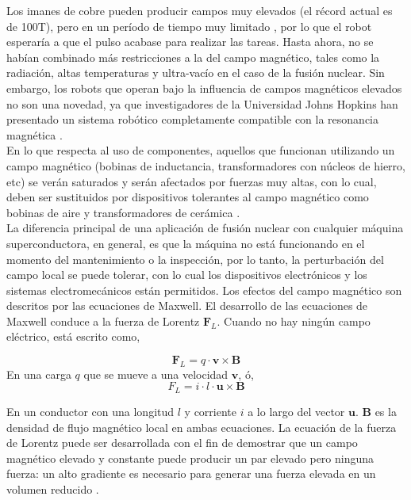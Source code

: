 Los imanes de cobre pueden producir campos muy elevados (el récord actual es de 100T), pero en un período de tiempo muy limitado \cite{Kiyoshi2006}, por lo que el robot esperaría a que el pulso acabase para realizar las tareas. Hasta ahora, no se habían combinado más restricciones a la del campo magnético, tales como la radiación, altas temperaturas y ultra-vacío en el caso de la fusión nuclear. Sin embargo, los robots que operan bajo la influencia de campos magnéticos elevados no son una novedad, ya que investigadores de la Universidad Johns Hopkins han presentado un sistema robótico completamente compatible con la resonancia magnética \cite{Muntener2006}.\\


En lo que respecta al uso de componentes, aquellos que funcionan utilizando un campo magnético (bobinas de inductancia, transformadores con núcleos de hierro, etc) se verán saturados y serán afectados por fuerzas muy altas, con lo cual, deben ser sustituidos por dispositivos tolerantes al campo magnético como bobinas de aire y transformadores de cerámica \cite{izard2010hardening} .\\


La diferencia principal de una aplicación de fusión nuclear con cualquier máquina superconductora, en general, es que la máquina no está funcionando en el momento del mantenimiento o la inspección, por lo tanto, la perturbación del campo local se puede tolerar, con lo cual los dispositivos electrónicos y los sistemas electromecánicos están permitidos. Los efectos del campo magnético son descritos por las ecuaciones de Maxwell. El desarrollo de las ecuaciones de Maxwell conduce a la fuerza de Lorentz $\mathbf{F}_ {L} $. Cuando no hay ningún campo eléctrico, está escrito como,

\begin{equation}
	\label{ecu:lorentz1}
	\mathbf{F}_{L}=q\cdot{}\mathbf{v}\times{}\mathbf{B}
\end{equation}
En una carga $q$ que se mueve a una velocidad $\mathbf{v}$, ó,
\begin{equation}
	\label{ecu:lorentz2}
	F_{L}=i\cdot{}l\cdot{}\mathbf{u}\times{}\mathbf{B}
\end{equation}

En un conductor con una longitud $l$ y corriente $i$ a lo largo del vector $\mathbf{u}$. $\mathbf{B}$ es la densidad de flujo magnético local en ambas ecuaciones. La ecuación de la fuerza de Lorentz puede ser desarrollada con el fin de demostrar que un campo magnético elevado y constante puede producir un par elevado pero ninguna fuerza: un alto gradiente es necesario para generar una fuerza elevada en un volumen reducido \cite{Izard2009}.

